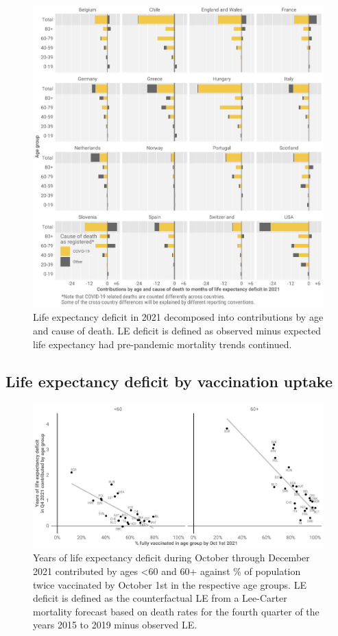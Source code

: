 \documentclass[12pt]{article}
\begin{document}
\begin{figure}[ht!]
    \centering
    \includegraphics{53-e0diffcodT.pdf}
    \caption{Life expectancy deficit in 2021 decomposed into contributions by age and cause of death. LE deficit is defined as observed minus expected life expectancy had pre-pandemic mortality trends continued.}
    \label{fig:e0diffcod}
\end{figure}

\subsection*{Life expectancy deficit by vaccination uptake}

\begin{figure}[ht!]
    \centering
    \includegraphics{55-vaxe0.pdf}
    \caption{Years of life expectancy deficit during October through December 2021 contributed by ages <60 and 60+ against \% of population twice vaccinated by October 1st in the respective age groups. LE deficit is defined as the counterfactual LE from a Lee-Carter mortality forecast based on death rates for the fourth quarter of the years 2015 to 2019 minus observed LE.}
    \label{fig:vaxe0}
\end{figure}
\end{document}
